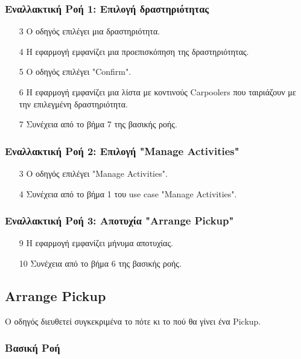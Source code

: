 \subsubsection{Εναλλακτική Ροή 1: Επιλογή δραστηριότητας}

\begin{enumerate}
    \item[3] Ο οδηγός επιλέγει μια δραστηριότητα.
    \item[4] Η εφαρμογή εμφανίζει μια προεπισκόπηση της δραστηριότητας.
    \item[5] Ο οδηγός επιλέγει "Confirm".
    \item[6] Η εφαρμογή εμφανίζει μια λίστα με κοντινούς Carpoolers που ταιριάζουν με την
        επιλεγμένη δραστηριότητα.
    \item[7] Συνέχεια από το βήμα 7 της βασικής ροής.
\end{enumerate}

\subsubsection{Εναλλακτική Ροή 2: Επιλογή "Manage Activities"}

\begin{enumerate}
    \item[3] Ο οδηγός επιλέγει "Manage Activities".
    \item[4] Συνέχεια από το βήμα 1 του use case "Manage Activities".
\end{enumerate}

\subsubsection{Εναλλακτική Ροή 3: Αποτυχία "Arrange Pickup"}

\begin{enumerate}
    \item[9] Η εφαρμογή εμφανίζει μήνυμα αποτυχίας.
    \item[10] Συνέχεια από το βήμα 6 της βασικής ροής.
\end{enumerate}

\newpage

\subsection{Arrange Pickup}

Ο οδηγός διευθετεί συγκεκριμένα το πότε κι το πού θα γίνει ένα Pickup.

\subsubsection{Βασική Ροή}

